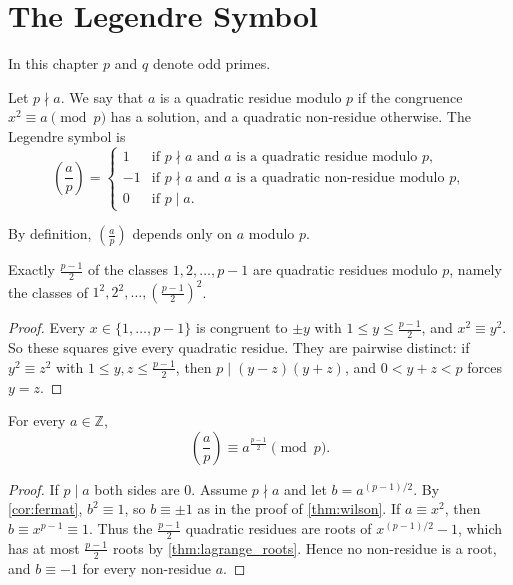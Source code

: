 \section{The Legendre Symbol}
In this chapter $p$ and $q$ denote odd primes.

\begin{definition}\label{def:legendre}
    Let $p \nmid a$. We say that $a$ is a quadratic residue modulo $p$ if the congruence $x^2 \equiv a \pmod p$ has a solution, and a quadratic non-residue otherwise. The Legendre symbol is
    \begin{equation*}
        \left(\frac{a}{p}\right) =
        \begin{cases}
            1 & \text{if } p \nmid a \text{ and } a \text{ is a quadratic residue modulo } p,\\
            -1 & \text{if } p \nmid a \text{ and } a \text{ is a quadratic non-residue modulo } p,\\
            0 & \text{if } p \mid a.
        \end{cases}
    \end{equation*}
\end{definition}
By definition, $\left(\frac{a}{p}\right)$ depends only on $a$ modulo $p$.

\begin{proposition}\label{prop:number_of_residues}
    Exactly $\frac{p-1}{2}$ of the classes $1, 2, \dots, p - 1$ are quadratic residues modulo $p$, namely the classes of $1^2, 2^2, \dots, \left(\frac{p-1}{2}\right)^2$.
\end{proposition}
\begin{proof}
    Every $x \in \{1, \dots, p-1\}$ is congruent to $\pm y$ with $1 \le y \le \frac{p-1}{2}$, and $x^2 \equiv y^2$. So these squares give every quadratic residue. They are pairwise distinct: if $y^2 \equiv z^2$ with $1 \le y, z \le \frac{p-1}{2}$, then $p \mid (y - z)(y + z)$, and $0 < y + z < p$ forces $y = z$.
\end{proof}

\begin{theorem}\label{thm:euler_criterion}
    For every $a \in \mathbb{Z}$,
    \begin{equation*}
        \left(\frac{a}{p}\right) \equiv a^{\frac{p-1}{2}} \pmod p.
    \end{equation*}
\end{theorem}
\begin{proof}
    If $p \mid a$ both sides are $0$. Assume $p \nmid a$ and let $b = a^{(p-1)/2}$. By \cref{cor:fermat}, $b^2 \equiv 1$, so $b \equiv \pm 1$ as in the proof of \cref{thm:wilson}. If $a \equiv x^2$, then $b \equiv x^{p-1} \equiv 1$. Thus the $\frac{p-1}{2}$ quadratic residues are roots of $x^{(p-1)/2} - 1$, which has at most $\frac{p-1}{2}$ roots by \cref{thm:lagrange_roots}. Hence no non-residue is a root, and $b \equiv -1$ for every non-residue $a$.
\end{proof}

